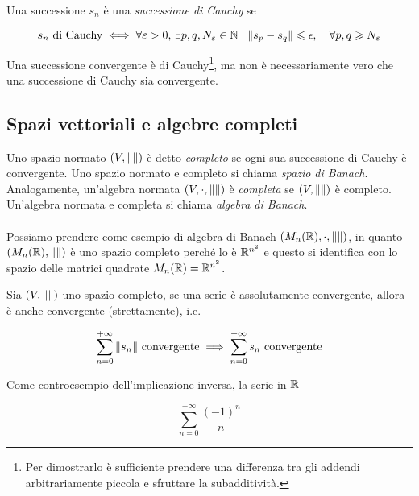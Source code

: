 Una successione $ s_{n} $ è una \textit{successione di Cauchy} se

\begin{equation}
	s_{n} \text{ di Cauchy} \iff \forall \varepsilon > 0, \, \exists p,q,N_{\varepsilon} \in \mathbb{N} \mid \norm{s_{p} - s_{q}} \leqslant \epsilon, \quad \forall p,q \geqslant N_{\varepsilon}
\end{equation}

\begin{remark}
	Una successione convergente è di Cauchy\footnote{%
		Per dimostrarlo è sufficiente prendere una differenza tra gli addendi arbitrariamente piccola e sfruttare la subadditività.%
	}, ma non è necessariamente vero che una successione di Cauchy sia convergente.
\end{remark}

\subsection{Spazi vettoriali e algebre completi}

Uno spazio normato $ (V,\norm{}) $ è detto \textit{completo} se ogni sua successione di Cauchy è convergente. Uno spazio normato e completo si chiama \textit{spazio di Banach}.\\
Analogamente, un'algebra normata $ (V,\cdot,\norm{}) $ è \textit{completa} se $ (V,\norm{}) $ è completo. Un'algebra normata e completa si chiama \textit{algebra di Banach}.\\\\
%
Possiamo prendere come esempio di algebra di Banach $ (M_{n}(\mathbb{R}),\cdot,\norm{}) $, in quanto $ (M_{n}(\mathbb{R}),\norm{}) $ è uno spazio completo perché lo è $ \mathbb{R}^{n^{2}} $ e questo si identifica con lo spazio delle matrici quadrate $ M_{n}(\mathbb{R}) = \mathbb{R}^{n^{2}} $.

\begin{definition}
	Sia $ (V,\norm{}) $ uno spazio completo, se una serie è assolutamente convergente, allora è anche convergente (strettamente), i.e.
	
	\begin{equation}
		\sum_{n=0}^{+\infty} \norm{s_{n}} \text{ convergente} \implies \sum_{n=0}^{+\infty} s_{n} \text{ convergente}
	\end{equation}
\end{definition}

Come controesempio dell'implicazione inversa, la serie in $ \mathbb{R} $

\begin{equation}
	\sum_{n=0}^{+\infty} \dfrac{(-1)^{n}}{n}
\end{equation}

